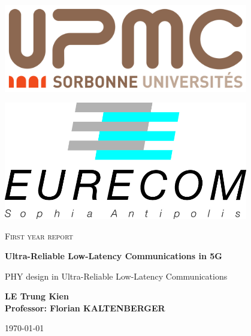\documentclass{report}
\begin{document}
\begin{titlepage}

\begin{minipage}{0.47\textwidth}
\includegraphics[width=0.8\textwidth, left]{UPMC_Sorbonne_logo.png}
\end{minipage}
\begin{minipage}{0.47\textwidth}
\includegraphics[width=0.8\textwidth, right]{EURECOM_logo.jpg}
\end{minipage}
\par\vspace{1cm}
\centering
{\scshape\Large First year report\par}
\par\vspace{1cm}

   \begin{center}
       \vspace*{1cm}
        \Huge
       \textbf{Ultra-Reliable Low-Latency Communications in 5G }
 
       \vspace{0.5cm}
       \Large
        PHY design in Ultra-Reliable Low-Latency Communications 
 
       \vspace{1.5cm}
 
       \textbf{LE Trung Kien}\\
       \textbf{Professor: Florian KALTENBERGER}
 
       \vfill
 

 
       \vspace{0.8cm}
 

       
       
      {\large \today\par}
 
   \end{center}
\end{titlepage}
\end{document}

